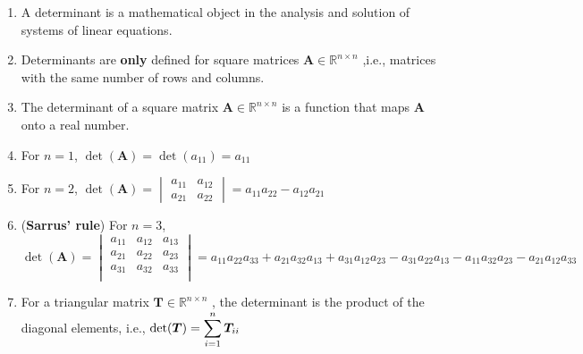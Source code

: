 \begin{enumerate}
    \item A determinant is a mathematical object in the analysis and solution of systems of linear equations.
    \hfill \cite{mfml/book/mml/Deisenroth-Faisal-Ong}

    \item Determinants are \textbf{only} defined for square matrices $\bm{A} \in \mathbb{R}^{n\times n}$ ,i.e., matrices with the same number of rows and columns.
    \hfill \cite{mfml/book/mml/Deisenroth-Faisal-Ong}

    \item The determinant of a square matrix $\bm{A} \in \mathbb{R}^{n\times n}$ is a function that maps $\bm{A}$ onto a real number.
    \hfill \cite{mfml/book/mml/Deisenroth-Faisal-Ong}

    \item For $n=1$, $\det(\bm{A}) = \det(a_{11}) = a_{11}$
    \hfill \cite{mfml/book/mml/Deisenroth-Faisal-Ong}

    \item For $n=2$, 
    $
        \det(\bm{A}) 
        = \begin{vmatrix}
            a_{11} & a_{12} \\
            a_{21} & a_{22}
        \end{vmatrix} 
        = a_{11} a_{22} - a_{12} a_{21}
    $
    \hfill \cite{mfml/book/mml/Deisenroth-Faisal-Ong}

    \item (\textbf{Sarrus’ rule}) For $n=3$, 
    \hfill \cite{mfml/book/mml/Deisenroth-Faisal-Ong}
    \\[0.3cm]
    $
        \det(\bm{A}) 
        = \begin{vmatrix}
            a_{11} & a_{12} & a_{13} \\
            a_{21} & a_{22} & a_{23} \\
            a_{31} & a_{32} & a_{33} \\
        \end{vmatrix} 
        = a_{11} a_{22} a_{33}  + a_{21} a_{32} a_{13}  + a_{31} a_{12} a_{23}  - a_{31} a_{22} a_{13}  - a_{11} a_{32} a_{23}  - a_{21} a_{12} a_{33} 
    $
    \hfill \cite{mfml/book/mml/Deisenroth-Faisal-Ong}

    \item For a triangular matrix $\bm{T} \in \mathbb{R}^{n\times n}$ , the determinant is the product of the diagonal elements, i.e., $\det(\bm{T}) = \displaystyle\sum ^n _{i=1} \bm{T}_{ii}$
    \hfill \cite{mfml/book/mml/Deisenroth-Faisal-Ong}


\end{enumerate}
